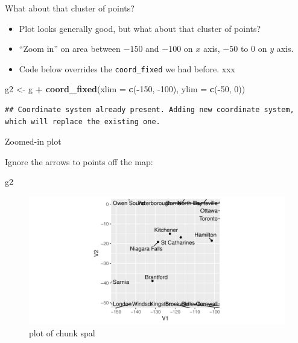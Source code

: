 \documentclass[ignorenonframetext,]{beamer}
\newenvironment{Shaded}{\begin{snugshade}}{\end{snugshade}}
\newcommand{\DataTypeTok}[1]{\textcolor[rgb]{0.13,0.29,0.53}{#1}}
\newcommand{\DecValTok}[1]{\textcolor[rgb]{0.00,0.00,0.81}{#1}}
\newcommand{\KeywordTok}[1]{\textcolor[rgb]{0.13,0.29,0.53}{\textbf{#1}}}
\newcommand{\NormalTok}[1]{#1}
\newcommand{\OperatorTok}[1]{\textcolor[rgb]{0.81,0.36,0.00}{\textbf{#1}}}
\newcommand{\StringTok}[1]{\textcolor[rgb]{0.31,0.60,0.02}{#1}}
\begin{document}
\begin{frame}[fragile]{What about that cluster of points?}
\protect\hypertarget{what-about-that-cluster-of-points}{}

\begin{itemize}
\item
  Plot looks generally good, but what about that cluster of points?
\item
  ``Zoom in'' on area between \(-150\) and \(-100\) on \(x\) axis,
  \(-50\) to 0 on \(y\) axis.
\item
  Code below overrides the \texttt{coord\_fixed} we had before. xxx
\end{itemize}

\small

\begin{Shaded}
\begin{Highlighting}[]
\NormalTok{g2 <-}\StringTok{ }\NormalTok{g }\OperatorTok{+}\StringTok{ }\KeywordTok{coord_fixed}\NormalTok{(}\DataTypeTok{xlim =} \KeywordTok{c}\NormalTok{(}\OperatorTok{-}\DecValTok{150}\NormalTok{, }\DecValTok{-100}\NormalTok{), }\DataTypeTok{ylim =} \KeywordTok{c}\NormalTok{(}\OperatorTok{-}\DecValTok{50}\NormalTok{, }\DecValTok{0}\NormalTok{))}
\end{Highlighting}
\end{Shaded}

\begin{verbatim}
## Coordinate system already present. Adding new coordinate system, which will replace the existing one.
\end{verbatim}

\normalsize

\end{frame}

\begin{frame}[fragile]{Zoomed-in plot}
\protect\hypertarget{zoomed-in-plot}{}

Ignore the arrows to points off the map:

\begin{Shaded}
\begin{Highlighting}[]
\NormalTok{g2}
\end{Highlighting}
\end{Shaded}

\begin{figure}
\centering
\includegraphics{figure/spal-1.pdf}
\caption{plot of chunk spal}
\end{figure}

\end{frame}
\end{document}
